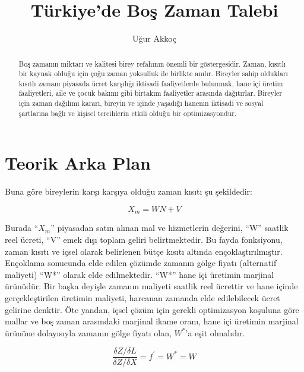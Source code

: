\documentclass[11pt]{article}
\title{Türkiye'de Boş Zaman Talebi}
\author{Uğur Akkoç}
\begin{document}
\tableofcontents \pagebreak

\listoftables

\listoffigures

\maketitle
	
	\begin{abstract}
		Boş zamanın miktarı ve kalitesi birey refahının önemli bir göstergesidir. Zaman, kısıtlı bir kaynak olduğu için çoğu zaman yoksulluk ile birlikte anılır. Bireyler sahip oldukları kısıtlı zamanı piyasada ücret karşılığı iktisadi faaliyetlerde bulunmak, hane içi üretim faaliyetleri, aile ve çocuk bakımı gibi birtakım faaliyetler arasında dağıtırlar. Bireyler için zaman dağılımı kararı, bireyin ve içinde yaşadığı hanenin iktisadi ve sosyal şartlarına bağlı ve kişisel tercihlerin etkili olduğu bir optimizasyondur.
	\end{abstract}
	
	\section{Teorik Arka Plan}

\doublespacing
Buna göre bireylerin karşı karşıya olduğu zaman kısıtı şu şekildedir: \linebreak
	
\begin{equation}
X_{m} = WN + V
\end{equation}

Burada $“X_m”$ piyasadan satın alınan mal ve hizmetlerin değerini, “W” saatlik reel ücreti, “V” emek dışı toplam geliri belirtmektedir. Bu fayda fonksiyonu, zaman kısıtı ve içsel olarak belirlenen bütçe kısıtı altında ençoklaştırıl\-mıştır. Ençoklama sonucunda elde edilen çözümde zamanın gölge fiyatı (alternatif maliyeti) “W*” olarak elde edilmektedir. “W*” hane içi üretimin marjinal ürünüdür. Bir başka deyişle zamanın maliyeti saatlik reel ücrettir ve hane içinde gerçekleştirilen üretimin maliyeti, harcanan zamanda elde edilebilecek ücret gelirine denktir. Öte yandan, içsel çözüm için gerekli optimizasyon koşuluna göre mallar ve boş zaman arasındaki marjinal ikame oranı, hane içi üretimin marjinal ürününe dolayısıyla zamanın gölge fiyatı olan, $W^*$’a eşit olmalıdır. \linebreak

\begin{equation}
\dfrac{\delta Z/\delta L}{\delta Z/\delta X} = f^{'} = W^{\ast} = W
\end{equation}   
		
\end{document}
